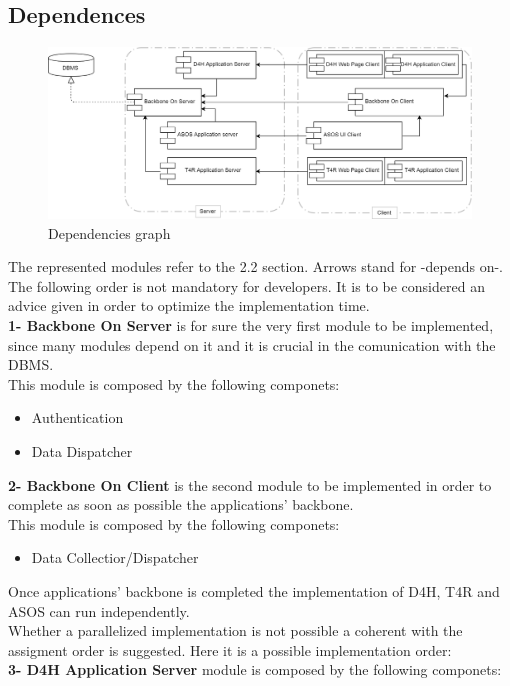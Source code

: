 \subsection{Dependences}
\begin{figure}[H]
\caption{Dependencies graph}
\includegraphics[width = \textwidth]{sections/implementationIntegrationTestGraphs/DependenciesGraph.png}
\end{figure}
The represented modules refer to the 2.2 section. Arrows stand for -depends on-.\\
The following order is not mandatory for developers. It is to be considered an advice given in order to optimize the implementation time.\\
\textbf{1- Backbone On Server} is for sure the very first module to be implemented, since many modules depend on it and it is crucial in the comunication with the DBMS.\\ This module is composed by the following componets:
\begin{itemize}
\item Authentication
\item Data Dispatcher
\end{itemize}
 \textbf{2- Backbone On Client} is the second module to be implemented in order to complete as soon as possible the applications' backbone.\\ This module is composed by the following componets:
\begin{itemize}
\item Data Collectior/Dispatcher
\end{itemize}
Once applications' backbone is completed the implementation of D4H, T4R and ASOS can run independently.\\ Whether a parallelized implementation is not possible a coherent with the assigment order is suggested. Here it is a possible implementation order:\\
 \textbf{3- D4H Application Server} module is composed by the following componets:
